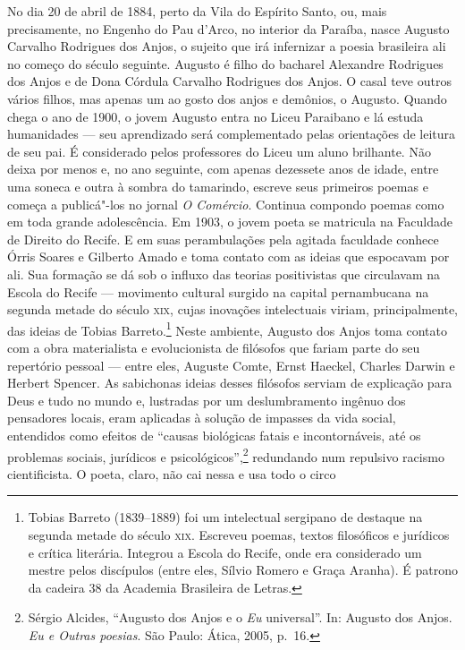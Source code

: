 No dia 20 de abril de 1884, perto da Vila do Espírito Santo, ou,
mais precisamente, no Engenho do Pau d’Arco, no interior da Paraíba,
nasce Augusto Carvalho Rodrigues dos Anjos, o sujeito que irá
infernizar a poesia brasileira ali no começo do século seguinte.
Augusto é filho do bacharel Alexandre Rodrigues dos Anjos e de Dona
Córdula Carvalho Rodrigues dos Anjos. O casal teve outros vários
filhos, mas apenas um ao gosto dos anjos e demônios, o Augusto. Quando
chega o ano de 1900, o jovem Augusto entra no Liceu Paraibano e lá
estuda humanidades --- seu aprendizado será complementado pelas 
orientações de leitura de seu pai. É considerado pelos
professores do Liceu um aluno brilhante. Não deixa por menos e, no ano
seguinte, com apenas dezessete anos de idade, entre uma soneca e outra à
sombra do tamarindo, escreve seus primeiros poemas e começa a
publicá"-los no jornal \textit{O Comércio}. Continua compondo poemas
como em toda grande adolescência. Em 1903, o jovem poeta se matricula
na Faculdade de Direito do Recife. E em suas perambulações pela agitada
faculdade conhece Órris Soares e Gilberto Amado e toma contato
com as ideias que espocavam por ali. Sua formação se dá sob o influxo
das teorias positivistas que circulavam na Escola do Recife --- movimento
cultural surgido na capital pernambucana na segunda metade do século
\textsc{xix}, cujas inovações intelectuais viriam, principalmente, das
ideias de Tobias Barreto.\footnote{ Tobias Barreto (1839--1889) foi um
intelectual sergipano de destaque na segunda metade do século \textsc{xix}.
Escreveu poemas, textos filosóficos e jurídicos e crítica literária.
Integrou a Escola do Recife, onde era considerado um mestre pelos
discípulos (entre eles, Sílvio Romero e Graça Aranha). É patrono da
cadeira 38 da Academia Brasileira de Letras.} Neste ambiente, Augusto dos Anjos toma
contato com a obra materialista e evolucionista de filósofos que fariam
parte do seu repertório pessoal --- entre eles, Auguste Comte, Ernst
Haeckel, Charles Darwin e Herbert Spencer. As sabichonas ideias
desses filósofos serviam de explicação para Deus e tudo no mundo e,
lustradas por um deslumbramento ingênuo dos pensadores locais,
eram aplicadas à solução de impasses da vida social, entendidos como efeitos de “causas
biológicas fatais e incontornáveis, até os problemas sociais, jurídicos
e psicológicos”,\footnote{Sérgio Alcides, “Augusto dos Anjos e o \textit{Eu} universal”. In:
Augusto dos Anjos. \textit{Eu e Outras poesias}. São Paulo:
Ática, 2005, p.~16.} redundando num repulsivo racismo
cientificista. O poeta, claro, não cai nessa e usa todo o circo
